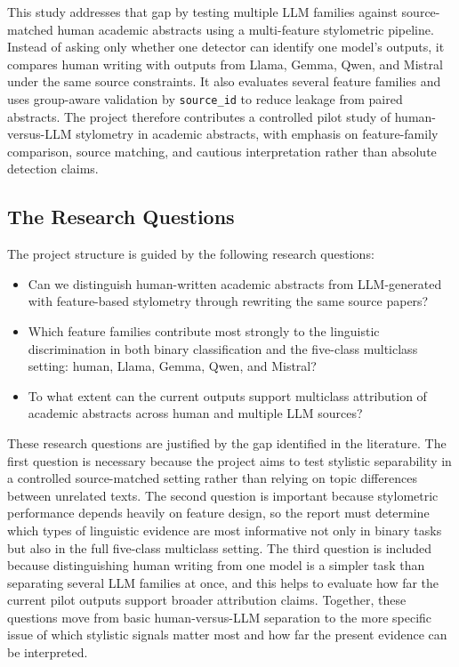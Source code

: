 \documentclass[12pt,a4paper]{article}
\begin{document}
This study addresses that gap by testing multiple LLM families against source-matched human academic abstracts using a multi-feature stylometric pipeline. Instead of asking only whether one detector can identify one model's outputs, it compares human writing with outputs from Llama, Gemma, Qwen, and Mistral under the same source constraints. It also evaluates several feature families and uses group-aware validation by \texttt{source\_id} to reduce leakage from paired abstracts. The project therefore contributes a controlled pilot study of human-versus-LLM stylometry in academic abstracts, with emphasis on feature-family comparison, source matching, and cautious interpretation rather than absolute detection claims.

\subsection{The Research Questions}

The project structure is guided by the following research questions:

\begin{itemize}
    \item Can we distinguish human-written academic abstracts from LLM-generated with feature-based stylometry through rewriting the same source papers?
    \item Which feature families contribute most strongly to the linguistic discrimination in both binary classification and the five-class multiclass setting: human, Llama, Gemma, Qwen, and Mistral?
    \item To what extent can the current outputs support multiclass attribution of academic abstracts across human and multiple LLM sources?
\end{itemize}

These research questions are justified by the gap identified in the literature. The first question is necessary because the project aims to test stylistic separability in a controlled source-matched setting rather than relying on topic differences between unrelated texts. The second question is important because stylometric performance depends heavily on feature design, so the report must determine which types of linguistic evidence are most informative not only in binary tasks but also in the full five-class multiclass setting. The third question is included because distinguishing human writing from one model is a simpler task than separating several LLM families at once, and this helps to evaluate how far the current pilot outputs support broader attribution claims. Together, these questions move from basic human-versus-LLM separation to the more specific issue of which stylistic signals matter most and how far the present evidence can be interpreted.
\end{document}
